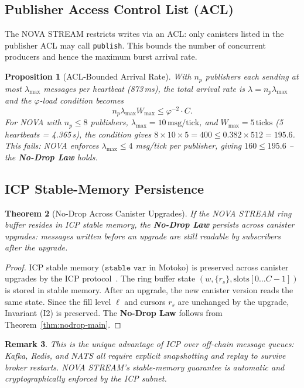 \documentclass[12pt]{article}
\newtheorem{theorem}{Theorem}
\newtheorem{proposition}[theorem]{Proposition}
\newtheorem{remark}[theorem]{Remark}
\newcommand{\AMOR}{\varphi^{-2}}
\newcommand{\SCAP}{C}
\newcommand{\NoDrop}{\textbf{No-Drop Law}}
\begin{document}
\subsection{Publisher Access Control List (ACL)}

The NOVA STREAM restricts writes via an ACL: only canisters listed in the
publisher ACL may call \texttt{publish}.  This bounds the number of concurrent
producers and hence the maximum burst arrival rate.

\begin{proposition}[ACL-Bounded Arrival Rate]
\label{prop:acl}
With $n_p$ publishers each sending at most $\lambda_{\max}$ messages per heartbeat
(873\,ms), the total arrival rate is $\lambda = n_p \lambda_{\max}$ and the
$\varphi$-load condition becomes
\[
  n_p \lambda_{\max} W_{\max} \le \AMOR \cdot \SCAP.
\]
For NOVA with $n_p \le 8$ publishers, $\lambda_{\max} = 10\,\text{msg/tick}$,
and $W_{\max} = 5\,\text{ticks}$ (5 heartbeats = 4.365\,s), the condition
gives $8 \times 10 \times 5 = 400 \le 0.382 \times 512 = 195.6$.  This fails:
NOVA enforces $\lambda_{\max} \le 4$ msg/tick per publisher, giving $160 \le
195.6$ -- the \NoDrop{} holds.
\end{proposition}

\subsection{ICP Stable-Memory Persistence}

\begin{theorem}[No-Drop Across Canister Upgrades]
\label{thm:icp-stable}
If the NOVA STREAM ring buffer resides in ICP stable memory, the \NoDrop{}
persists across canister upgrades: messages written before an upgrade are still
readable by subscribers after the upgrade.
\end{theorem}

\begin{proof}
ICP stable memory ($\texttt{stable var}$ in Motoko) is preserved across
canister upgrades by the ICP protocol~\cite{DFINITY2023}.  The ring buffer
state $(w, \{r_s\}, \text{slots}[0\ldots\SCAP-1])$ is stored in stable memory.
After an upgrade, the new canister version reads the same state.  Since the
fill level $\ell$ and cursors $r_s$ are unchanged by the upgrade, Invariant
(I2) is preserved.  The \NoDrop{} follows from
Theorem~\ref{thm:nodrop-main}.
\end{proof}

\begin{remark}
This is the unique advantage of ICP over off-chain message queues: Kafka,
Redis, and NATS all require explicit snapshotting and replay to survive broker
restarts.  NOVA STREAM's stable-memory guarantee is automatic and
cryptographically enforced by the ICP subnet.
\end{remark}
\end{document}

